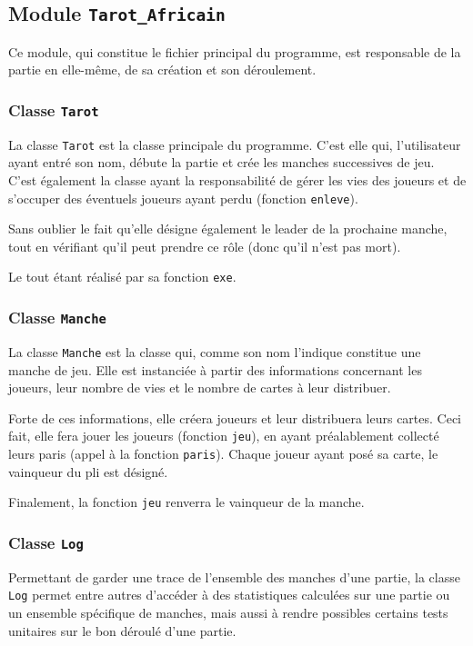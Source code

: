    \subsection{Module \texttt{Tarot\_Africain}}\label{subsec:module-tarot-africain}
      Ce module, qui constitue le fichier principal du programme, est responsable de la partie en elle-même, de sa création et son déroulement.
      \subsubsection{Classe \texttt{Tarot}}
         La classe \texttt{Tarot} est la classe principale du programme.
         C'est elle qui, l'utilisateur ayant entré son nom, débute la partie et crée les manches successives de jeu.
         C'est également la classe ayant la responsabilité de gérer les vies des joueurs et de s'occuper des éventuels joueurs ayant perdu (fonction \texttt{enleve}).

         Sans oublier le fait qu'elle désigne également le leader de la prochaine manche, tout en vérifiant qu'il peut prendre ce rôle (donc qu'il n'est pas mort).

         Le tout étant réalisé par sa fonction \texttt{exe}.
      \subsubsection{Classe \texttt{Manche}}
         La classe \texttt{Manche} est la classe qui, comme son nom l'indique constitue une manche de jeu.
         Elle est instanciée à partir des informations concernant les joueurs, leur nombre de vies et le nombre de cartes à leur distribuer.

         Forte de ces informations, elle créera joueurs et leur distribuera leurs cartes.
         Ceci fait, elle fera jouer les joueurs (fonction \texttt{jeu}), en ayant préalablement collecté leurs paris (appel à la fonction \texttt{paris}).
         Chaque joueur ayant posé sa carte, le vainqueur du pli est désigné.

         Finalement, la fonction \texttt{jeu} renverra le vainqueur de la manche.
      \subsubsection{Classe \texttt{Log}}
         Permettant de garder une trace de l'ensemble des manches d'une partie, la classe \texttt{Log} permet entre autres d'accéder à des statistiques calculées sur une partie ou un ensemble spécifique de manches, mais aussi à rendre possibles certains tests unitaires sur le bon déroulé d'une partie.

